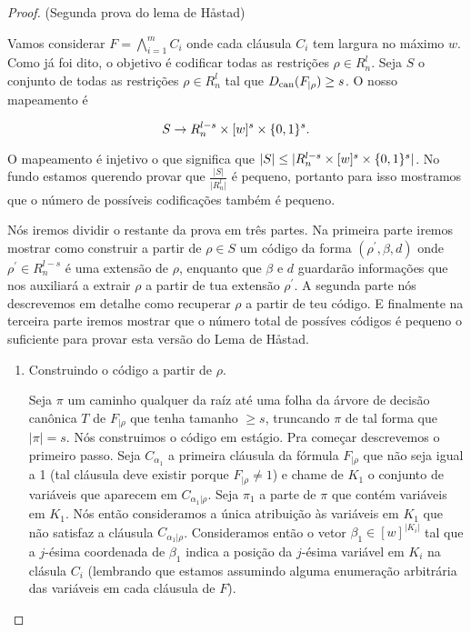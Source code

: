 \begin{proof} (Segunda prova do lema de Håstad)


Vamos considerar $F = \bigwedge_{i = 1}^{m} C_{i}$ onde cada cláusula $C_{i}$ tem largura no máximo $w$. Como já foi dito, o objetivo é codificar todas as restrições $\rho \in R_{n}^{l}$. Seja $S$ o conjunto de todas as restrições $\rho \in R_{n}^{l}$ tal que $D_{\text{can}}(F_{\lvert \rho}) \geq s$. O nosso mapeamento é

\begin{equation*}
	S \to R_{n}^{l - s} \times [w]^{s} \times \{0, 1\}^{s}.
\end{equation*}

O mapeamento é injetivo o que significa que $\lvert S \rvert \leq \lvert  R_{n}^{l - s} \times [w]^{s} \times \{0, 1\}^{s} \rvert$. No fundo estamos querendo provar que $\frac{\lvert S \rvert}{\lvert R_{n}^{l}\rvert}$ é pequeno, portanto para isso mostramos que o número de possíveis codificações também é pequeno.

Nós iremos dividir o restante da prova em três partes. Na primeira parte iremos mostrar como construir a partir de $\rho \in S$ um código da forma $(\rho^{\prime}, \beta, d)$ onde $\rho^{\prime} \in R_{n}^{l - s}$ é uma extensão de $\rho$, enquanto que $\beta$ e $d$ guardarão informações que nos auxiliará a extrair $\rho$ a partir de tua extensão $\rho^{\prime}$. A segunda parte nós descrevemos em detalhe como recuperar $\rho$ a partir de teu código. E finalmente na terceira parte iremos mostrar que o número total de possíves códigos é pequeno o suficiente para provar esta versão do Lema de Håstad. 

\begin{enumerate}

	\item Construindo o código a partir de $\rho$.
	
	Seja $\pi$ um caminho qualquer da raíz até uma folha da árvore de decisão canônica $T$ de $F_{\lvert \rho}$ que tenha tamanho $\geq s$, truncando $\pi$ de tal forma que $\lvert \pi \rvert = s$. Nós construimos o código em estágio. Pra começar descrevemos o primeiro passo. Seja $C_{\alpha_{1}}$ a primeira cláusula da fórmula $F_{\lvert \rho}$ que não seja igual a 1 (tal cláusula deve existir porque $F_{\lvert \rho} \neq 1$) e chame de $K_{1}$ o conjunto de variáveis que aparecem em $C_{\alpha_{1} \lvert \rho}$. Seja $\pi_{1}$ a parte de $\pi$ que contém variáveis em $K_{1}$. Nós então consideramos a única atribuição às variáveis em $K_{1}$ que não satisfaz a cláusula $C_{\alpha_{1} \lvert \rho}$. Consideramos então o vetor $\beta_{1} \in [w]^{\lvert K_{i} \rvert}$ tal que a $j$-ésima coordenada de $\beta_{1}$ indica a posição da $j$-ésima variável em $K_{i}$ na clásula $C_{i}$ (lembrando que estamos assumindo alguma enumeração arbitrária das variáveis em cada cláusula de $F$).
	

\end{enumerate}
\end{proof}
